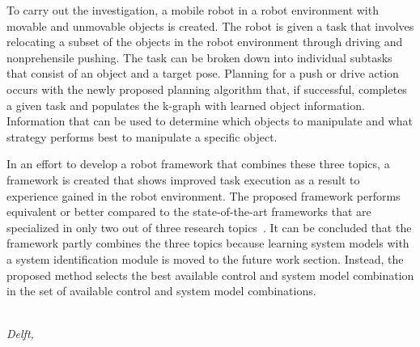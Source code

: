To carry out the investigation, a mobile robot in a robot environment with movable and unmovable objects is created. The robot is given a task that involves relocating a subset of the objects in the robot environment through driving and nonprehensile pushing. The task can be broken down into individual subtasks that consist of an object and a target pose. Planning for a push or drive action occurs with the newly proposed planning algorithm that, if successful, completes a given task and populates the \acl{k-graph} with learned object information. Information that can be used to determine which objects to manipulate and what strategy performs best to manipulate a specific object.\bs

In an effort to develop a robot framework that combines these three topics, a framework is created that shows improved task execution as a result to experience gained in the robot environment. The proposed framework performs equivalent or better compared to the state-of-the-art frameworks that are specialized in only two out of three research topics~\cite{wang_affordancebased_2020}. It can be concluded that the framework partly combines the three topics because learning system models with a system identification module is moved to the future work section. Instead, the proposed method selects the best available control and system model combination in the set of available control and system model combinations.\bs

\begin{flushright}
{\makeatletter\itshape
    \@author\\
    Delft, \monthname{} \the\year{}
\makeatother}
\end{flushright}
